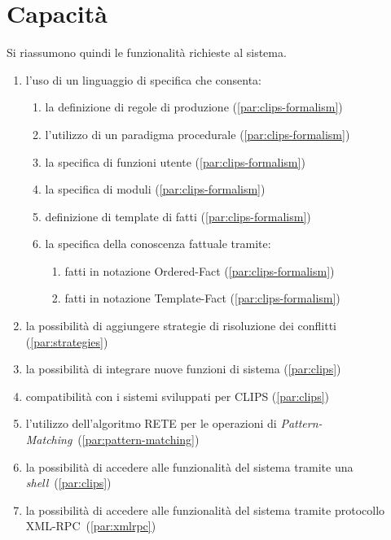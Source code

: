 %

\section{Capacità}

Si riassumono quindi le funzionalità richieste al sistema.

\begin{enumerate}
	\item l'uso di un linguaggio di specifica che consenta:
		\begin{enumerate}
			\item la definizione di regole di produzione (\ref{par:clips-formalism})
			\item l'utilizzo di un paradigma procedurale (\ref{par:clips-formalism})
			\item la specifica di funzioni utente (\ref{par:clips-formalism})
			\item la specifica di moduli (\ref{par:clips-formalism})
			\item definizione di template di fatti (\ref{par:clips-formalism})
			\item la specifica della conoscenza fattuale tramite:
				\begin{enumerate}
					\item fatti in notazione Ordered-Fact (\ref{par:clips-formalism})
					\item fatti in notazione Template-Fact (\ref{par:clips-formalism})
				\end{enumerate}
		\end{enumerate}
	\item la possibilità di aggiungere strategie di risoluzione dei conflitti (\ref{par:strategies})
	\item la possibilità di integrare nuove funzioni di sistema (\ref{par:clips})
	\item compatibilità con i sistemi sviluppati per CLIPS (\ref{par:clips})
	\item l'utilizzo dell'algoritmo RETE per le operazioni di \emph{Pattern-Matching}~(\ref{par:pattern-matching})
	\item la possibilità di accedere alle funzionalità del sistema tramite una \emph{shell}~(\ref{par:clips})
	\item la possibilità di accedere alle funzionalità del sistema tramite protocollo XML-RPC~(\ref{par:xmlrpc})
\end{enumerate}


